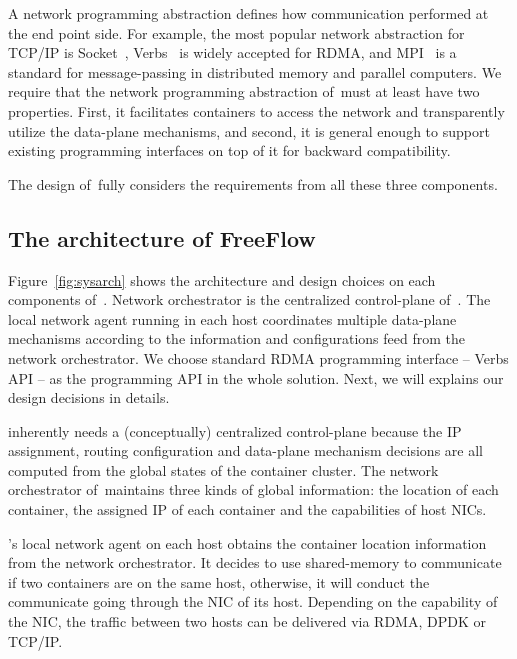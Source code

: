 A network programming abstraction defines how communication 
performed at the end point side.
For example, the most popular network abstraction for TCP/IP is Socket~\cite{?},
Verbs~\cite{?} is widely accepted for RDMA, and MPI~\cite{?} is a standard for
message-passing in distributed memory and parallel computers. 
We require that
the network programming abstraction of~\sysname must at least have two
properties. First, it facilitates containers to access the network and 
transparently utilize the data-plane mechanisms, and second, it is general 
enough to support existing programming interfaces on top of it for backward 
compatibility. 

The design of~\sysname fully considers the requirements from all these three
components.

\subsection{The architecture of FreeFlow}

Figure~\ref{fig:sysarch} shows the architecture and design choices on each 
components of~\sysname. Network orchestrator is the centralized control-plane
of~\sysname. The local network agent running in each host coordinates
multiple data-plane mechanisms according to the information and 
configurations feed
from the network orchestrator. We choose standard RDMA programming interface --
Verbs API -- as the programming API in the whole solution. Next, we will explains
our design decisions in details. 

 \sysname inherently needs a (conceptually)
centralized control-plane because the IP assignment, routing configuration and 
data-plane mechanism decisions are all computed from the global states of the
container cluster. The network orchestrator of~\sysname maintains three kinds
of global information: the location of each container, the assigned IP of each
container and the capabilities of host NICs.

 \sysname's local network agent on each host 
obtains the container location information from the network orchestrator. 
It decides to use shared-memory to communicate if two containers are on the
same host, otherwise, it will conduct the communicate going through 
the NIC of its host. Depending on the capability of the NIC, the traffic 
between two hosts can be delivered via RDMA, DPDK or TCP/IP.

